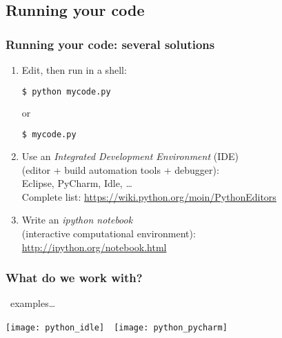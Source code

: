 \subsection{Running your code}
\begin{frame}[fragile, t]
\frametitle{Running your code: several solutions}

\begin{enumerate}
\item<1-> Edit, then run in a shell:
\begin{lstlisting}[language=bash]
$ python mycode.py
\end{lstlisting}
or 
\begin{lstlisting}[language=bash]
$ mycode.py
\end{lstlisting}
\item<2-> Use an \textit{Integrated Development Environment} (IDE)\\
(editor + build automation tools + debugger):\\
Eclipse, PyCharm, Idle, \ldots\\
Complete list: \url{https://wiki.python.org/moin/PythonEditors}
\item<3-> Write an \textit{ipython notebook}\\
(interactive computational environment):\\
\url{http://ipython.org/notebook.html} 
\end{enumerate}

\end{frame}

\begin{frame}[c]
\frametitle{What do we work with?}
\huge
\faLaptop~examples\ldots

\vfill 
\texttt{[image: python\_idle]}~~\texttt{[image: python\_pycharm]}

\end{frame}
